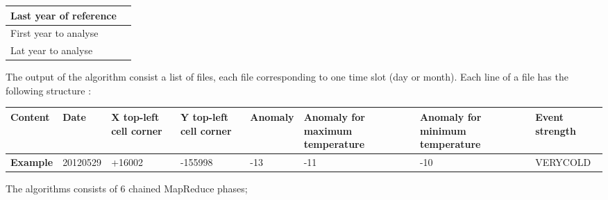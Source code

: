 \documentclass[12pt]{article}
\begin{document}
\begin{table}[h]
\begin{tabularx}{\textwidth}{|X|X|}
Last year of reference  &                                                                                                                                                                                                                                                                                          \\ \hline
First year to analyse   & \multirow{2}{*}{}                                                                                                                                                                                                                                                                        \\ \cline{1-1}
Lat year to analyse     &                                                                                                                                                                                                                                                                                          \\ \hline
\end{tabularx}
\end{table}

The output of the algorithm consist a list of files, each file corresponding to one time slot (day or month).
Each line of a file has the following structure :

\begin{table}[h]
\begin{tabular}{|l|l|l|l|l|l|l|l|}
\hline
\textbf{Content} & Date     & X top-left cell corner & Y top-left cell corner & Anomaly & Anomaly for maximum temperature & Anomaly for minimum temperature & Event  strength \\ \hline
\textbf{Example} & 20120529 & +16002                 & -155998                & -13     & -11                             & -10                             & VERYCOLD        \\ \hline
\end{tabular}
\end{table}

The algorithms consists of 6 chained MapReduce phases;
\end{document}
